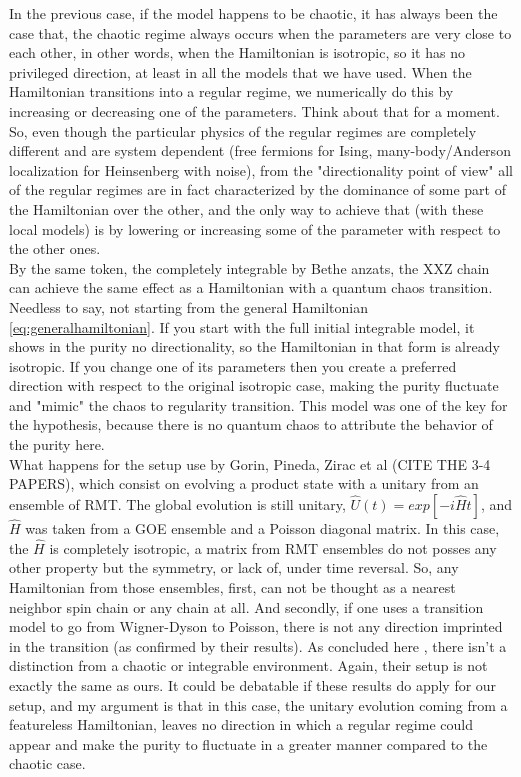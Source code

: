 In the previous case, if the model happens to be chaotic, it has always been the case that, the chaotic regime always occurs when the parameters are very close to each other, in other words, when the Hamiltonian is isotropic, so it has no privileged direction, at least in all the models that we have used. When the Hamiltonian transitions into a regular regime, we numerically do this by increasing or decreasing one of the parameters. Think about that for a moment. So, even though the particular physics of the regular regimes are completely different and are system dependent (free fermions for Ising, many-body/Anderson localization for Heinsenberg with noise), from the "directionality point of view" all of the regular regimes are in fact characterized by the dominance of some part of the Hamiltonian over the other, and the only way to achieve that (with these local models) is by lowering or increasing some of the parameter with respect to the other ones.\\

By the same token, the completely integrable by Bethe anzats, the XXZ chain can achieve the same effect as a Hamiltonian with a quantum chaos transition. Needless to say, not starting from the general Hamiltonian \ref{eq:generalhamiltonian}. If you start with the full initial integrable model, it shows in the purity no directionality, so the Hamiltonian in that form is already isotropic. If you change one of its parameters then you create a preferred direction with respect to the original isotropic case, making the purity fluctuate and "mimic" the chaos to regularity transition. This model was one of the key for the hypothesis, because there is no quantum chaos to attribute the behavior of the purity here.\\

What happens for the setup use by Gorin, Pineda, Zirac et al (CITE THE 3-4 PAPERS), which consist on evolving a product state with a unitary from an ensemble of RMT. The global evolution is still unitary, $\hat{U}(t) = exp[-i\hat{H}t]$, and $\hat{H}$ was taken from a GOE ensemble and a Poisson diagonal matrix. In this case, the $\hat{H}$ is completely isotropic, a matrix from RMT ensembles do not posses any other property but the symmetry, or lack of, under time reversal. So, any Hamiltonian from those ensembles, first, can not be thought as a nearest neighbor spin chain or any chain at all. And secondly, if one uses a transition model to go from Wigner-Dyson to Poisson, there is not any direction imprinted in the transition (as confirmed by their results). As concluded here \cite{Gorinpurity2002}, there isn't a distinction from a chaotic or integrable environment. Again, their setup is not exactly the same as ours. It could be debatable if these results do apply for our setup, and my argument is that in this case, the unitary evolution coming from a featureless Hamiltonian, leaves no direction in which a regular regime could appear and make the purity to fluctuate in a greater manner compared to the chaotic case.\\

